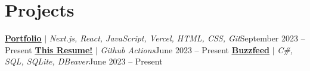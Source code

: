 
\section{Projects}

\resumeSubHeadingListStart
\resumeProjectHeading
{\textbf{\href{https://jaychen.app}{\underline{Portfolio}}} $|$ \emph{Next.js, React, JavaScript, Vercel, HTML, CSS, Git}}{September 2023 -- Present}
\resumeItemListStart
{}
\resumeItemListEnd
\resumeProjectHeading
{\textbf{\href{https://github.com/jundachen10/jays_resume}{\underline{This Resume!}}} $|$ \emph{Github Actions}}{June 2023 -- Present}
\resumeItemListStart
{}
\resumeItemListEnd
\resumeProjectHeading
{\textbf{\href{https://github.com/jundachen10/buzzfeed}{\underline{Buzzfeed}}} $|$ \emph{C\#, SQL, SQLite, DBeaver}}{June 2023 -- Present}
\resumeItemListStart
{}
\resumeItemListEnd
\resumeSubHeadingListEnd